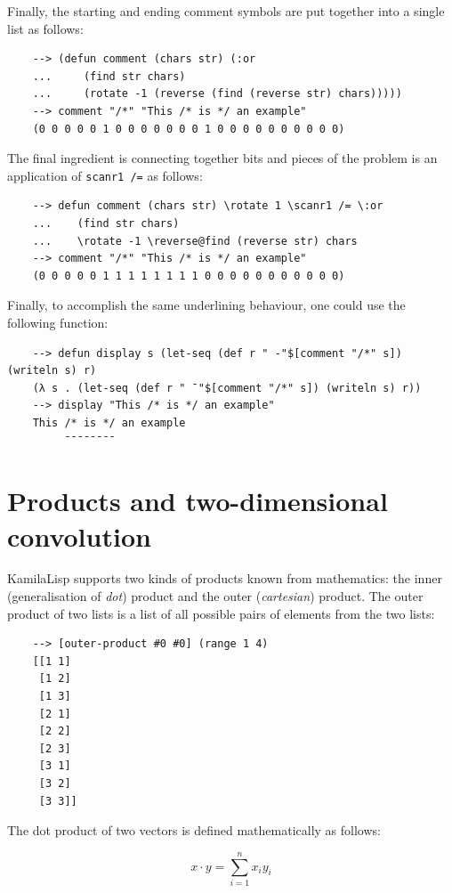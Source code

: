 Finally, the starting and ending comment symbols are put together into a single list as follows:

\begin{Verbatim}
    --> (defun comment (chars str) (:or
    ...     (find str chars)
    ...     (rotate -1 (reverse (find (reverse str) chars)))))
    --> comment "/*" "This /* is */ an example"
    (0 0 0 0 0 1 0 0 0 0 0 0 0 1 0 0 0 0 0 0 0 0 0 0)
\end{Verbatim}

The final ingredient is connecting together bits and pieces of the problem is an application of \verb|scanr1 /=| as follows:

\begin{Verbatim}
    --> defun comment (chars str) \rotate 1 \scanr1 /= \:or
    ...    (find str chars)
    ...    \rotate -1 \reverse@find (reverse str) chars
    --> comment "/*" "This /* is */ an example"
    (0 0 0 0 0 1 1 1 1 1 1 1 1 0 0 0 0 0 0 0 0 0 0 0)
\end{Verbatim}

Finally, to accomplish the same underlining behaviour, one could use the following function:

\begin{Verbatim}
    --> defun display s (let-seq (def r " -"$[comment "/*" s]) (writeln s) r)
    (λ s . (let-seq (def r " ¯"$[comment "/*" s]) (writeln s) r))
    --> display "This /* is */ an example"
    This /* is */ an example
         ¯¯¯¯¯¯¯¯
\end{Verbatim}

\section{Products and two-dimensional convolution}

KamilaLisp supports two kinds of products known from mathematics: the inner (generalisation of \textit{dot}) product and the outer (\textit{cartesian}) product. The outer product of two lists is a list of all possible pairs of elements from the two lists:

\begin{Verbatim}
    --> [outer-product #0 #0] (range 1 4)
    [[1 1]
     [1 2]
     [1 3]
     [2 1]
     [2 2]
     [2 3]
     [3 1]
     [3 2]
     [3 3]]
\end{Verbatim}

The dot product of two vectors is defined mathematically as follows:

$$
{\displaystyle x \cdot y = \sum_{i=1}^{n}x_{i}y_{i}}
$$

